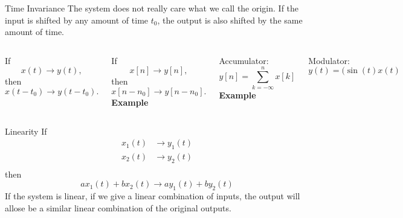 \begin{frame}{Time Invariance}
    The system does not really care what we call the origin. If the input is shifted by any amount of time $t_0$, the output is also shifted by the same amount of time.
    {
        \begin{columns}
            If
            \begin{equation*}
                x(t) \rightarrow y(t),
            \end{equation*}
            then
            \begin{equation*}
                x(t - t_0) \rightarrow y(t - t_0).
            \end{equation*}

            If
            \begin{equation*}
                x[n] \rightarrow y[n],
            \end{equation*}
            then
            \begin{equation*}
                x[n - n_0] \rightarrow y[n - n_0].
            \end{equation*}
            \pause
            \textbf{ Example}\par
            Accumulator:
            \begin{equation*}
                y[n] = \sum_{k=-\infty}^{n}x[k]
            \end{equation*}
            \textbf{ Example}\par
            Modulator:
            \begin{equation*}
                y(t) = (\sin(t)x(t)
            \end{equation*}
        \end{columns}
    }
\end{frame}


\begin{frame}{Linearity}
    If
    \begin{align*}
      x_1(t) &\rightarrow y_1(t) \\
      x_2(t) &\rightarrow y_2(t) \\
    \end{align*}
    then
    \begin{equation*}
        ax_1(t) + bx_2(t) \rightarrow  ay_1(t) + by_2(t)
    \end{equation*}
    If the system is linear, if we give a linear combination of inputs, the output will allose be a similar linear combination of the original outputs.
    {
        \begin{columns}
        \end{columns}
    }
\end{frame}




